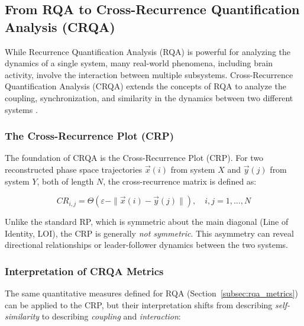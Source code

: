 \documentclass{article}
\begin{document}
				


				\subsection{From RQA to Cross-Recurrence Quantification Analysis (CRQA)}
					\label{subsec:crqa_theory}

					While Recurrence Quantification Analysis (RQA) is powerful for analyzing the dynamics of a single system, many real-world phenomena, including brain activity, involve the interaction between multiple subsystems. Cross-Recurrence Quantification Analysis (CRQA) extends the concepts of RQA to analyze the coupling, synchronization, and similarity in the dynamics between two different systems \cite{marwan2007}.

					\subsubsection{The Cross-Recurrence Plot (CRP)}

					The foundation of CRQA is the Cross-Recurrence Plot (CRP). For two reconstructed phase space trajectories \( \vec{x}(i) \) from system \( X \) and \( \vec{y}(j) \) from system \( Y \), both of length \( N \), the cross-recurrence matrix is defined as:

					\begin{equation}
					CR_{i,j} = \Theta(\varepsilon - \|\vec{x}(i) - \vec{y}(j)\|), \quad i,j = 1, \ldots, N
					\end{equation}

					Unlike the standard RP, which is symmetric about the main diagonal (Line of Identity, LOI), the CRP is generally \emph{not symmetric}. This asymmetry can reveal directional relationships or leader-follower dynamics between the two systems.

					\subsubsection{Interpretation of CRQA Metrics}

					The same quantitative measures defined for RQA (Section~\ref{subsec:rqa_metrics}) can be applied to the CRP, but their interpretation shifts from describing \emph{self-similarity} to describing \emph{coupling} and \emph{interaction}:
\end{document}
